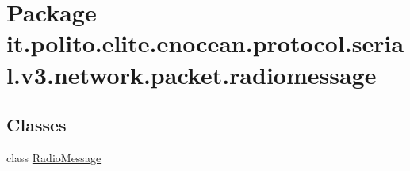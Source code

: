 \hypertarget{namespaceit_1_1polito_1_1elite_1_1enocean_1_1protocol_1_1serial_1_1v3_1_1network_1_1packet_1_1radiomessage}{}\section{Package it.\+polito.\+elite.\+enocean.\+protocol.\+serial.\+v3.\+network.\+packet.\+radiomessage}
\label{namespaceit_1_1polito_1_1elite_1_1enocean_1_1protocol_1_1serial_1_1v3_1_1network_1_1packet_1_1radiomessage}
\subsection*{Classes}
\begin{DoxyCompactItemize}
\item 
class \hyperlink{classit_1_1polito_1_1elite_1_1enocean_1_1protocol_1_1serial_1_1v3_1_1network_1_1packet_1_1radiomessage_1_1_radio_message}{Radio\+Message}
\end{DoxyCompactItemize}
